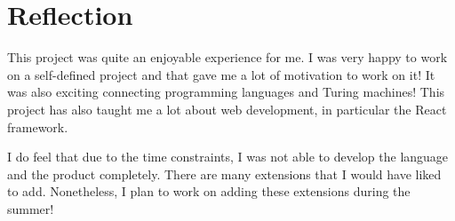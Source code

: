 \section{Reflection}
This project was quite an enjoyable experience for me. I was very happy to work on a self-defined project and that gave me a lot of motivation to work on it! It was also exciting connecting programming languages and Turing machines! This project has also taught me a lot about web development, in particular the React framework.

I do feel that due to the time constraints, I was not able to develop the language and the product completely. There are many extensions that I would have liked to add. Nonetheless, I plan to work on adding these extensions during the summer!
